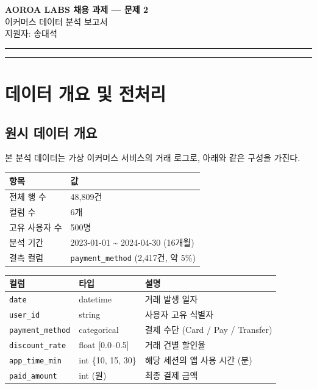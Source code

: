 \documentclass[a4paper, 11pt]{article}
\begin{document}

\begin{center}
  {\LARGE\bfseries AOROA LABS 채용 과제 — 문제 2}\\[0.6em]
  {\large 이커머스 데이터 분석 보고서}\\[0.4em]
  {\normalsize 지원자: 송대석}
\end{center}
\vspace{0.3em}
\hrule
\vspace{0.5em}

\tableofcontents
\vspace{0.5em}
\hrule
\newpage

\section{데이터 개요 및 전처리}

\subsection{원시 데이터 개요}

본 분석 데이터는 가상 이커머스 서비스의 거래 로그로, 아래와 같은 구성을 가진다.

\begin{center}
\begin{tabular}{ll}
\toprule
\textbf{항목} & \textbf{값} \\
\midrule
전체 행 수 & 48,809건 \\
컬럼 수 & 6개 \\
고유 사용자 수 & 500명 \\
분석 기간 & 2023-01-01 \textasciitilde{} 2024-04-30 (16개월) \\
결측 컬럼 & \texttt{payment\_method} (2,417건, 약 5\%) \\
\bottomrule
\end{tabular}
\end{center}

\begin{center}
\begin{tabular}{llp{7.5cm}}
\toprule
\textbf{컬럼} & \textbf{타입} & \textbf{설명} \\
\midrule
\texttt{date} & datetime & 거래 발생 일자 \\
\texttt{user\_id} & string & 사용자 고유 식별자 \\
\texttt{payment\_method} & categorical & 결제 수단 (Card / Pay / Transfer) \\
\texttt{discount\_rate} & float [0.0–0.5] & 거래 건별 할인율 \\
\texttt{app\_time\_min} & int \{10, 15, 30\} & 해당 세션의 앱 사용 시간 (분) \\
\texttt{paid\_amount} & int (원) & 최종 결제 금액 \\
\bottomrule
\end{tabular}
\end{center}
\end{document}
